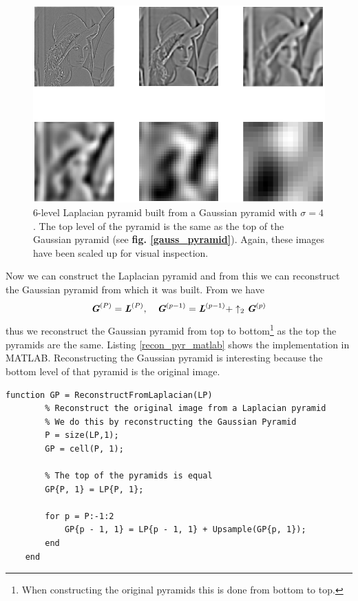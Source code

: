 \documentclass[a4paper, 10pt, final]{article}
\begin{document}
\begin{figure}[!h]
    \centering
    \includegraphics[angle=0,width=\textwidth]{images/laplace_pyr_6_4}
    \caption{6-level Laplacian pyramid built from a Gaussian pyramid
    with $\sigma = 4$. The top level of the pyramid is the same as the
    top of the Gaussian pyramid (see \textbf{fig. \ref{gauss_pyramid}}).
    Again, these images have been scaled up for visual inspection.}
    \label{laplace_pyramid}
\end{figure}

Now we can construct the Laplacian pyramid and from this we can
reconstruct the Gaussian pyramid from which it was built. From
\citep[Eq. (5.11)]{jahne-digital} we have
\begin{equation}
    \textbf{\em G}^{(P)} = \textbf{\em L}^{(P)}, ~~~ \textbf{\em G}^{(p - 1)} =
    \textbf{\em L}^{(p - 1)} + \uparrow_2\textbf{\em G}^{(p)}
    \label{gauss_reconstruct}
\end{equation}
thus we reconstruct the Gaussian pyramid from top to
bottom\footnote{When constructing the original pyramids this is done
from bottom to top.} as the top the pyramids are the same. Listing
\ref{recon_pyr_matlab} shows the implementation in MATLAB.
Reconstructing the Gaussian pyramid is interesting because the bottom
level of that pyramid is the original image.

\begin{lstlisting}[caption={Reconstruction of the Gaussian pyramid given
    a Laplacian pyramid.}, captionpos=b,
    label={recon_pyr_matlab}, float=b, numbers=none]
    function GP = ReconstructFromLaplacian(LP)
        % Reconstruct the original image from a Laplacian pyramid
        % We do this by reconstructing the Gaussian Pyramid
        P = size(LP,1);
        GP = cell(P, 1);
        
        % The top of the pyramids is equal
        GP{P, 1} = LP{P, 1};
        
        for p = P:-1:2
            GP{p - 1, 1} = LP{p - 1, 1} + Upsample(GP{p, 1});
        end
    end
\end{lstlisting}
\end{document}
